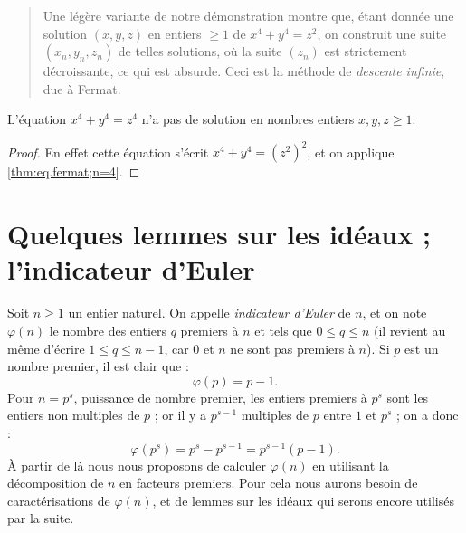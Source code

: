 \documentclass[11pt, %
  title in boldface,
  theorem in new line,
  theorem numbering = section,
  number theorems separately,
  simple name,
]{beaulivre}
\begin{document}
    \begin{quote}
        Une légère variante de notre démonstration montre que, étant donnée une solution \( (x,y,z) \) en entiers \( \geqslant 1 \) de \( x^4+y^4=z^2 \), on construit une suite \( (x_n,y_n,z_n) \) de telles solutions, où la suite \( (z_n) \) est strictement décroissante, ce qui est absurde. Ceci est la méthode de \emph{descente infinie}, due à Fermat.
    \end{quote}

    \begin{corollary}
        L'équation \( x^4+y^4=z^4 \) n'a pas de solution en nombres entiers \( x,y,z \geqslant 1 \).
    \end{corollary}
    \begin{proof}
        En effet cette équation s'écrit \( x^4+y^4=(z^2)^2 \), et on applique \cref{thm:eq.fermat;n=4}.
    \end{proof}

\section{Quelques lemmes sur les idéaux ; l'indicateur d'Euler}

    Soit \( n \geqslant 1 \) un entier naturel. On appelle \emph{indicateur d'Euler} de \( n \), et on note \( \varphi(n) \) le nombre des entiers \( q \) premiers à \( n \) et tels que \( 0 \leqslant q \leqslant n \) (il revient au même d'écrire \( 1 \leqslant q \leqslant n-1 \), car \( 0 \) et \( n \) ne sont pas premiers à \( n \)). Si \( p \) est un nombre premier, il est clair que :
    \begin{equation}
        \varphi(p) = p-1.
    \end{equation}
    Pour \( n = p^s \), puissance de nombre premier, les entiers premiers à \( p^s \) sont les entiers non multiples de \( p \) ; or il y a \( p^{s-1} \) multiples de \( p \) entre \( 1 \) et \( p^s \) ; on a donc :
    \begin{equation}\label{eq:indicateur d'Euler;puissance de nombre premier}
        \varphi(p^s) = p^s-p^{s-1} = p^{s-1}(p-1).
    \end{equation}
    À partir de là nous nous proposons de calculer \( \varphi(n) \) en utilisant la décomposition de \( n \) en facteurs premiers. Pour cela nous aurons besoin de caractérisations de \( \varphi(n) \), et de lemmes sur les idéaux qui serons encore utilisés par la suite.
\end{document}
